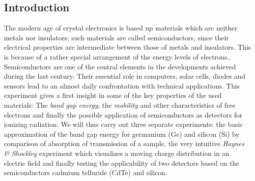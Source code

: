 \subsection{Introduction}
The modern age of crystal electronics is based up materials which are neither
metals nor insulators; such materials are called semiconductors, 
since their electrical properties are
intermediate between those of metals and insulators. 
This is because of a rather special arrangement of
the energy levels of electrons.\cite{phillips2012bonds}. 
Semiconductors are one of the central elements in the developments 
achieved during the last century. Their essential role in computers, 
solar cells, diodes and sensors lead to an almost daily confrontation 
with technical applications. This experiment gives a first insight 
in some of the key properties of the used materials: 
The \emph{band gap energy}, the \emph{mobility} and other characteristics 
of free electrons and finally the possible application 
of semiconductors as detectors for ionizing radiation. 
We will thus carry out three separate experiments: the basic approximation 
of the band gap energy for germanium (Ge) and silicon (Si) by comparison 
of absorption of transmission of a sample, the very intuitive 
\emph{Haynes \& Shockley} experiment 
which visualizes a moving charge distribution in an electric field 
and finally testing the applicability of two detectors based on the 
semiconductors cadmium telluride (CdTe) and silicon.

